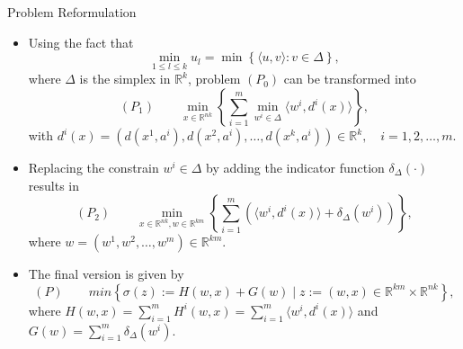 \documentclass[9pt,handout]{beamer} %
\newcommand{\R}{\mathbb{R}} %
\begin{document}
    \begin{frame}{Problem Reformulation}
	    \begin{itemize}[<+->]
	    	\item Using the fact that
				\begin{equation*}
					\min\limits_{1 \leq l \leq k} u_l = \min \left\lbrace \langle u,v \rangle : v \in \Delta \right\rbrace ,
				\end{equation*}
				where $\Delta$ is the simplex in $\R^k$, problem $(P_0)$ can be transformed into
				\begin{equation*}
					(P_1) \qquad \min\limits_{x \in \R^{nk}} \left\{ \sum\limits_{i=1}^{m} \min\limits_{w^i \in \Delta} \langle w^i , d^i(x) \rangle \right\},
				\end{equation*}
				with $d^{i}(x) = (d(x^1,a^i), d(x^2,a^i), \ldots , d(x^k,a^i)) \in \mathbb{R}^k, \quad i=1, 2, \ldots , m$.
			\item Replacing the constrain $w^i \in \Delta$ by adding the indicator function $\delta_{\Delta}(\cdot)$ results in
				\begin{equation*}
					(P_2) \qquad \min\limits_{x \in \mathbb{R}^{nk} , w \in \mathbb{R}^{km}} \left\lbrace \sum\limits_{i=1}^{m} \left( \langle w^i , d^i(x) \rangle + \delta_{\Delta}(w^i) \right) \right\rbrace,
				\end{equation*}
				where $w = (w^1, w^2, \ldots , w^m) \in \R^{km}$.
			\item The final version is given by
				\begin{equation*}
					(P) \qquad min \left\lbrace \sigma(z) := H(w,x) + G(w) \mid z := (w,x) \in \R^{km} \times \R^{nk} \right\rbrace, 
				\end{equation*}
				where $H(w,x) = \sum\limits_{i=1}^{m} H^i(w,x) = \sum\limits_{i=1}^{m} \langle w^i , d^i(x) \rangle$ and $G(w) = \sum\limits_{i=1}^{m} \delta_{\Delta}(w^i).$			
		\end{itemize}
    \end{frame}
\end{document}

